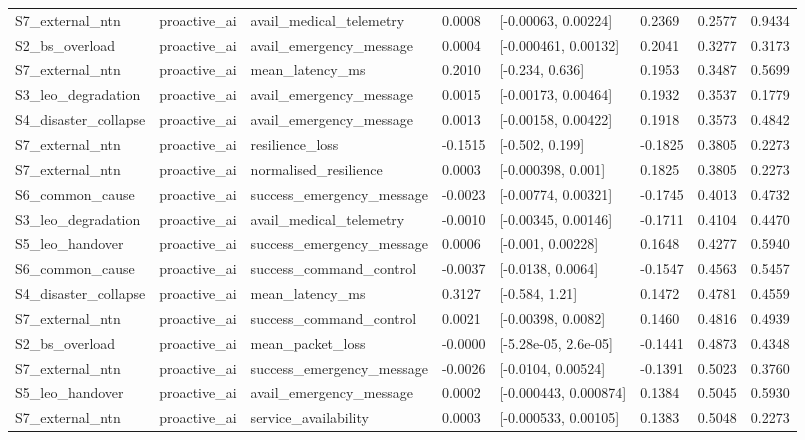 \begin{tabular}{llllllll}
S7\_external\_ntn & proactive\_ai & avail\_medical\_telemetry & 0.0008 & [-0.00063, 0.00224] & 0.2369 & 0.2577 & 0.9434 \\
S2\_bs\_overload & proactive\_ai & avail\_emergency\_message & 0.0004 & [-0.000461, 0.00132] & 0.2041 & 0.3277 & 0.3173 \\
S7\_external\_ntn & proactive\_ai & mean\_latency\_ms & 0.2010 & [-0.234, 0.636] & 0.1953 & 0.3487 & 0.5699 \\
S3\_leo\_degradation & proactive\_ai & avail\_emergency\_message & 0.0015 & [-0.00173, 0.00464] & 0.1932 & 0.3537 & 0.1779 \\
S4\_disaster\_collapse & proactive\_ai & avail\_emergency\_message & 0.0013 & [-0.00158, 0.00422] & 0.1918 & 0.3573 & 0.4842 \\
S7\_external\_ntn & proactive\_ai & resilience\_loss & -0.1515 & [-0.502, 0.199] & -0.1825 & 0.3805 & 0.2273 \\
S7\_external\_ntn & proactive\_ai & normalised\_resilience & 0.0003 & [-0.000398, 0.001] & 0.1825 & 0.3805 & 0.2273 \\
S6\_common\_cause & proactive\_ai & success\_emergency\_message & -0.0023 & [-0.00774, 0.00321] & -0.1745 & 0.4013 & 0.4732 \\
S3\_leo\_degradation & proactive\_ai & avail\_medical\_telemetry & -0.0010 & [-0.00345, 0.00146] & -0.1711 & 0.4104 & 0.4470 \\
S5\_leo\_handover & proactive\_ai & success\_emergency\_message & 0.0006 & [-0.001, 0.00228] & 0.1648 & 0.4277 & 0.5940 \\
S6\_common\_cause & proactive\_ai & success\_command\_control & -0.0037 & [-0.0138, 0.0064] & -0.1547 & 0.4563 & 0.5457 \\
S4\_disaster\_collapse & proactive\_ai & mean\_latency\_ms & 0.3127 & [-0.584, 1.21] & 0.1472 & 0.4781 & 0.4559 \\
S7\_external\_ntn & proactive\_ai & success\_command\_control & 0.0021 & [-0.00398, 0.0082] & 0.1460 & 0.4816 & 0.4939 \\
S2\_bs\_overload & proactive\_ai & mean\_packet\_loss & -0.0000 & [-5.28e-05, 2.6e-05] & -0.1441 & 0.4873 & 0.4348 \\
S7\_external\_ntn & proactive\_ai & success\_emergency\_message & -0.0026 & [-0.0104, 0.00524] & -0.1391 & 0.5023 & 0.3760 \\
S5\_leo\_handover & proactive\_ai & avail\_emergency\_message & 0.0002 & [-0.000443, 0.000874] & 0.1384 & 0.5045 & 0.5930 \\
S7\_external\_ntn & proactive\_ai & service\_availability & 0.0003 & [-0.000533, 0.00105] & 0.1383 & 0.5048 & 0.2273 \\

\end{tabular}
